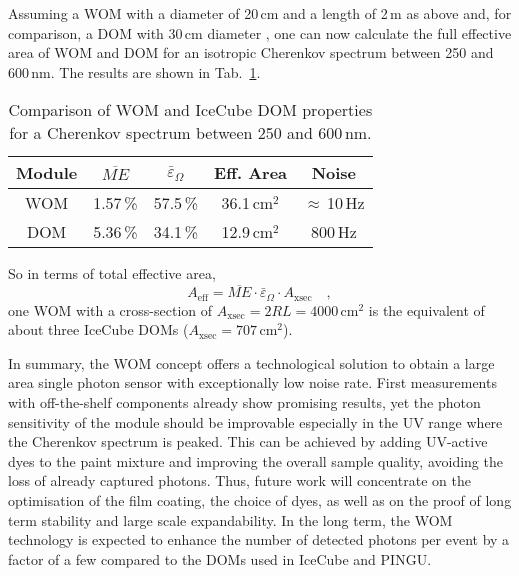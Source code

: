 Assuming a WOM with a diameter of 20\,cm and a length of 2\,m as above and, for 
comparison, a DOM with 30\,cm diameter \cite{ICdom}, one can now calculate the
full effective area of WOM and DOM for an isotropic Cherenkov spectrum between
250 and 600\,nm. The results are shown in Tab.~\ref{tab:comparison}.

\begin{table}[tbh]
\caption{Comparison of WOM and IceCube DOM properties for a Cherenkov spectrum
between 250 and 600\,nm.}
\label{tab:comparison}
\begin{center}
\begin{tabular}{ccccc}
\toprule
Module & $\overline{ME}$ & $\bar\varepsilon_\Omega$ & Eff. Area     & Noise  \\
\midrule
WOM    & 1.57\,\%        & 57.5\,\%      & 36.1\,cm$^2$   & $\approx$\,10\,Hz \\
DOM    & 5.36\,\%        & 34.1\,\%      & 12.9\,cm$^2$   & 800\,Hz           \\
\bottomrule
\end{tabular}
\end{center}
\end{table}

So in terms of total effective area, 
\begin{equation}
 A_\mathrm{eff} = \overline{ME}\cdot \bar\varepsilon_\Omega\cdot 
A_\mathrm{xsec}\quad,
\end{equation}
one WOM with a cross-section of $A_\mathrm{xsec} = 2 R L = 4000$\,cm$^2$ is the 
equivalent of about three IceCube DOMs ($A_\mathrm{xsec} = 707$\,cm$^2$).

In summary, the WOM concept offers a technological solution to obtain a 
large area single photon sensor with exceptionally low noise rate. First
measurements with off-the-shelf components already show promising results, yet
the photon sensitivity of the module should be improvable especially in the UV
range where the Cherenkov spectrum is peaked. This can be achieved by adding
UV-active dyes to the paint mixture and improving the overall sample quality,
avoiding the loss of already captured photons. Thus, future work
will concentrate on the optimisation of the film coating, the choice of dyes,
as well as on the proof of long term stability and large scale expandability.
In the long term, the WOM technology is expected to enhance the number of
detected photons per event by a factor of a few compared to the DOMs used in
IceCube and PINGU.


